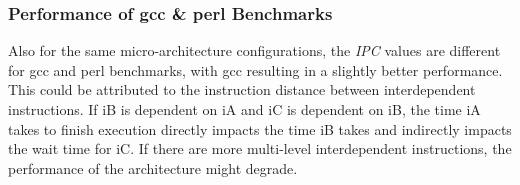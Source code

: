 \subsubsection{Performance of gcc \& perl Benchmarks}
Also for the same micro-architecture configurations, the \textit{IPC} values are different for gcc and perl benchmarks, with gcc resulting in a slightly better performance. This could be attributed to the instruction distance between interdependent instructions. If iB is dependent on iA and iC is dependent on iB, the time iA takes to finish execution directly impacts the time iB takes and indirectly impacts the wait time for iC. If there are more multi-level interdependent instructions, the performance of the architecture might degrade.
